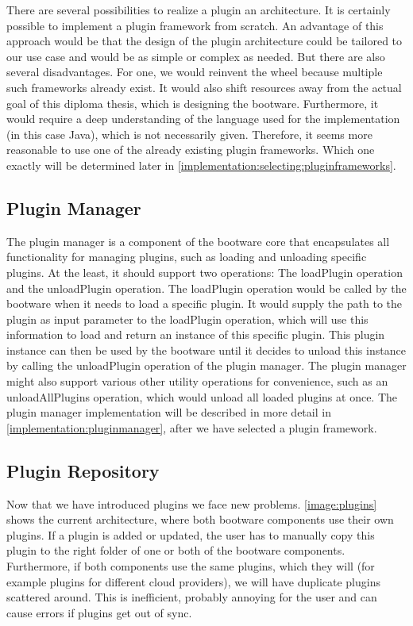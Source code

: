 There are several possibilities to realize a plugin an architecture.
It is certainly possible to implement a plugin framework from scratch.
An advantage of this approach would be that the design of the plugin architecture could be tailored to our use case and would be as simple or complex as needed.
But there are also several disadvantages.
For one, we would reinvent the wheel because multiple such frameworks already exist.
It would also shift resources away from the actual goal of this diploma thesis, which is designing the bootware.
Furthermore, it would require a deep understanding of the language used for the implementation (in this case Java), which is not necessarily given.
Therefore, it seems more reasonable to use one of the already existing plugin frameworks.
Which one exactly will be determined later in \autoref{implementation:selecting:pluginframeworks}.

\subsection{Plugin Manager}
\label{design:pluginmanager}

The plugin manager is a component of the bootware core that encapsulates all functionality for managing plugins, such as loading and unloading specific plugins.
At the least, it should support two operations: The loadPlugin operation and the unloadPlugin operation.
The loadPlugin operation would be called by the bootware when it needs to load a specific plugin.
It would supply the path to the plugin as input parameter to the loadPlugin operation, which will use this information to load and return an instance of this specific plugin.
This plugin instance can then be used by the bootware until it decides to unload this instance by calling the unloadPlugin operation of the plugin manager.
The plugin manager might also support various other utility operations for convenience, such as an unloadAllPlugins operation, which would unload all loaded plugins at once.
The plugin manager implementation will be described in more detail in \autoref{implementation:pluginmanager}, after we have selected a plugin framework.

\subsection{Plugin Repository}
\label{design:pluginrepository}

Now that we have introduced plugins we face new problems.
\autoref{image:plugins} shows the current architecture, where both bootware components use their own plugins.
If a plugin is added or updated, the user has to manually copy this plugin to the right folder of one or both of the bootware components.
Furthermore, if both components use the same plugins, which they will (for example plugins for different cloud providers), we will have duplicate plugins scattered around.
This is inefficient, probably annoying for the user and can cause errors if plugins get out of sync.

